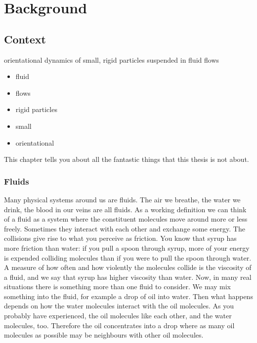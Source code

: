 \documentclass[thesis.tex]{subfiles}
\begin{document}
\chapter{Background}


\section{Context}

orientational dynamics of small, rigid particles suspended in fluid flows

\begin{itemize}
	\item fluid
	\item flows
	\item rigid particles
	\item small
	\item orientational
\end{itemize}

This chapter tells you about all the fantastic things that this thesis is not about.

\subsection{Fluids}

Many physical systems around us are fluids. The air we breathe, the water we drink, the blood in our veins are all fluids. As a working definition we can think of a fluid as a system where the constituent molecules move around more or less freely. Sometimes they interact with each other and exchange some energy. The collisions give rise to what you perceive as friction. You know that syrup has more friction than water: if you pull a spoon through syrup, more of your energy is expended colliding molecules than if you were to pull the spoon through water. A measure of how often and how violently the molecules collide is the viscosity of a fluid, and we say that syrup has higher viscosity than water. Now, in many real situations there is something more than one fluid to consider. We may mix something into the fluid, for example a drop of oil into water. Then what happens depends on how the water molecules interact with the oil molecules. As you probably have experienced, the oil molecules like each other, and the water molecules, too. Therefore the oil concentrates into a drop where as many oil molecules as possible may be neighbours with other oil molecules.
\end{document}
